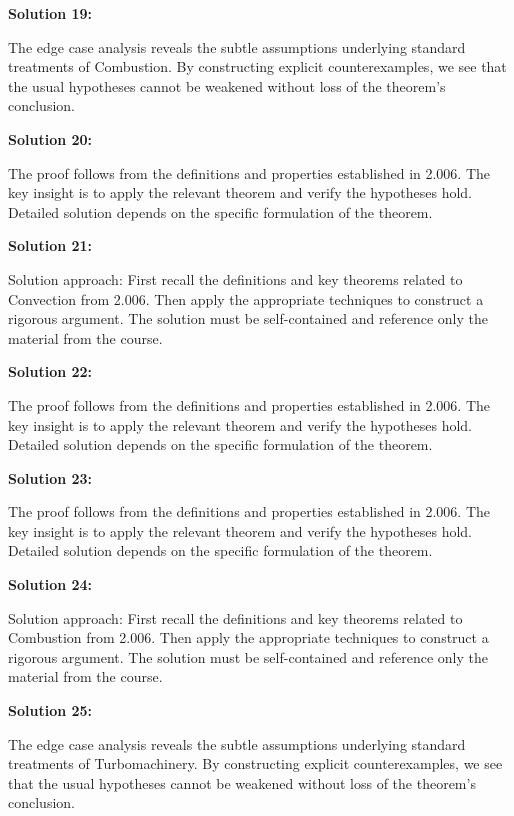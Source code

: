 \documentclass[12pt,a4paper]{exam}
\begin{document}
\vspace{0.5cm}

\textbf{Solution 19:}

The edge case analysis reveals the subtle assumptions underlying standard treatments of Combustion. By constructing explicit counterexamples, we see that the usual hypotheses cannot be weakened without loss of the theorem's conclusion.

\vspace{0.5cm}

\textbf{Solution 20:}

The proof follows from the definitions and properties established in 2.006. The key insight is to apply the relevant theorem and verify the hypotheses hold. Detailed solution depends on the specific formulation of the theorem.

\vspace{0.5cm}

\textbf{Solution 21:}

Solution approach: First recall the definitions and key theorems related to Convection from 2.006. Then apply the appropriate techniques to construct a rigorous argument. The solution must be self-contained and reference only the material from the course.

\vspace{0.5cm}

\textbf{Solution 22:}

The proof follows from the definitions and properties established in 2.006. The key insight is to apply the relevant theorem and verify the hypotheses hold. Detailed solution depends on the specific formulation of the theorem.

\vspace{0.5cm}

\textbf{Solution 23:}

The proof follows from the definitions and properties established in 2.006. The key insight is to apply the relevant theorem and verify the hypotheses hold. Detailed solution depends on the specific formulation of the theorem.

\vspace{0.5cm}

\textbf{Solution 24:}

Solution approach: First recall the definitions and key theorems related to Combustion from 2.006. Then apply the appropriate techniques to construct a rigorous argument. The solution must be self-contained and reference only the material from the course.

\vspace{0.5cm}

\textbf{Solution 25:}

The edge case analysis reveals the subtle assumptions underlying standard treatments of Turbomachinery. By constructing explicit counterexamples, we see that the usual hypotheses cannot be weakened without loss of the theorem's conclusion.

\vspace{0.5cm}
\end{document}
